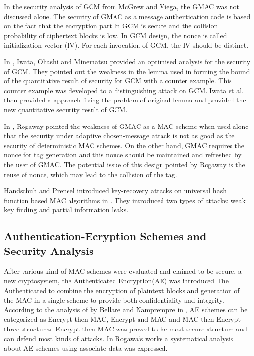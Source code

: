 \documentclass{article}
\begin{document}
In the security analysis of GCM from McGrew and Viega, the GMAC was not discussed alone. The security of GMAC as a message authentication code is based on the fact that the encryption part in GCM is secure and the collision probability of ciphertext blocks is low. 
In GCM design, the nonce is called initialization vector (IV). For each invocation of GCM, the IV should be distinct.

In \cite{breaking}, Iwata, Ohashi and Minematsu provided an optimised analysis for the security of GCM. They pointed out the weakness in the lemma used in forming the bound of the quantitative result of security for GCM with a counter example. This counter example was developed to a distinguishing attack on GCM. Iwata et al. then provided a approach fixing the problem of original lemma and provided the new quantitative security result of GCM. 

In \cite{Rogaway2011}, Rogaway pointed the weakness of GMAC as a MAC scheme when used alone that the security under adaptive chosen-message attack is not as good as the security of deterministic MAC schemes. On the other hand, GMAC requires the nonce for tag generation and this nonce should be maintained and refreshed by the user of GMAC. The potential issue of this design pointed by Rogaway is the reuse of nonce, which may lead to the collision of the tag. 

Handschuh and Preneel introduced key-recovery attacks on universal hash function based MAC algorithms in \cite{key_recover}. They introduced two types of attacks: weak key finding and partial information leaks.

\subsection{Authentication-Ecryption Schemes and Security Analysis}
After various kind of MAC schemes were evaluated and claimed to be secure, a new cryptosystem, the Authenticated Encryption(AE) was introduced The Authenticated to combine the encryption of
plaintext blocks and generation of the MAC in a single scheme to provide both
confidentiality and integrity. According to the analysis of by Bellare and Namprempre in \cite{ae-notion}, AE schemes can be categorized as Encrypt-then-MAC, Encrypt-and-MAC and MAC-then-Encrypt three structures. Encrypt-then-MAC was proved to be most secure structure and can defend most kinds of attacks. 
In Rogawa`s works \cite{aead} a systematical analysis about AE
schemes using associate data was expressed.  
\end{document}
